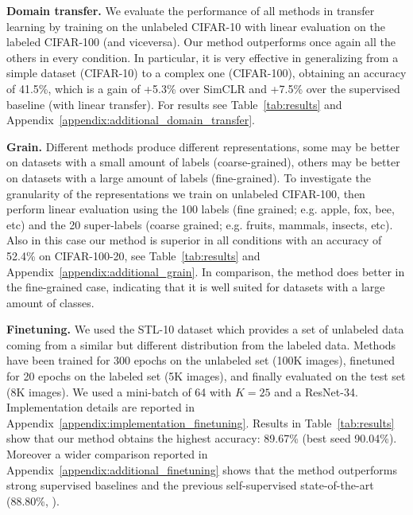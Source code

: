 \documentclass{article}
\begin{document}
\textbf{Domain transfer.}  We evaluate the performance of all methods in transfer learning by training on the unlabeled CIFAR-10 with linear evaluation on the labeled CIFAR-100 (and viceversa). Our method outperforms once again all the others in every condition. In particular, it is very effective in generalizing from a simple dataset (CIFAR-10) to a complex one (CIFAR-100), obtaining an accuracy of 41.5\%, which is a gain of +5.3\% over SimCLR and +7.5\% over the supervised baseline (with linear transfer). For results see Table~\ref{tab:results} and Appendix~\ref{appendix:additional_domain_transfer}.

\textbf{Grain.} Different methods produce different representations, some may be better on datasets with a small amount of labels (coarse-grained), others may be better on datasets with a large amount of labels (fine-grained). To investigate the granularity of the representations we train on unlabeled CIFAR-100, then perform linear evaluation using the 100 labels (fine grained; e.g. apple, fox, bee, etc) and the 20 super-labels (coarse grained; e.g. fruits, mammals, insects, etc). Also in this case our method is superior in all conditions with an accuracy of 52.4\% on CIFAR-100-20, see Table~\ref{tab:results} and Appendix~\ref{appendix:additional_grain}. In comparison, the method does better in the fine-grained case, indicating that it is well suited for datasets with a large amount of classes.

\textbf{Finetuning.} We used the STL-10 dataset \citep{coates2011analysis} which provides a set of unlabeled data coming from a similar but different distribution from the labeled data. Methods have been trained for 300 epochs on the unlabeled set (100K images), finetuned for 20 epochs on the labeled set (5K images), and finally evaluated on the test set (8K images). We used a mini-batch of 64 with $K=25$ and a ResNet-34. Implementation details are reported in Appendix~\ref{appendix:implementation_finetuning}. Results in Table~\ref{tab:results} show that our method obtains the highest accuracy: 89.67\% (best seed 90.04\%). Moreover a wider comparison reported in Appendix~\ref{appendix:additional_finetuning} shows that the method outperforms strong supervised baselines and the previous self-supervised state-of-the-art (88.80\%, \citealp{ji2019invariant}).
\end{document}
